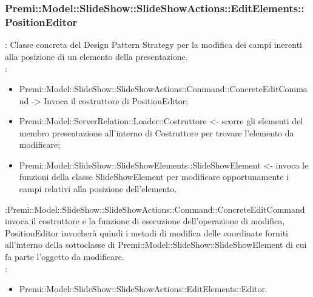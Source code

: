 {	\subsubsection{Premi::Model::SlideShow::SlideShowActions::EditElements::PositionEditor}{
				\textbf{\tipo}: Classe concreta del Design Pattern Strategy per la modifica dei campi inerenti alla posizione di un elemento della presentazione.\\	
				\textbf{\relaz}: 
				\begin{itemize}
					\item Premi::Model::SlideShow::SlideShowActions::Command::ConcreteEditCommand -> Invoca il costruttore di PositionEditor;
                    \item Premi::Model::ServerRelation::Loader::Costruttore <- scorre gli elementi del membro presentazione all'interno di Costruttore per trovare l'elemento da modificare; 
                    \item Premi::Model::SlideShow::SlideShowElements::SlideShowElement <- invoca le funzioni della classe SlideShowElement per modificare opportunamente i campi relativi alla posizione dell’elemento.
				\end{itemize}	\textbf{\interfacce}:Premi::Model::SlideShow::SlideShowActions::Command::ConcreteEditCommand invoca il costruttore e la funzione di esecuzione dell’operazione di modifica, PositionEditor invocherà quindi i metodi di modifica delle coordinate forniti all’interno della sottoclasse di Premi::Model::SlideShow::SlideShowElement di cui fa parte l’oggetto da modificare.\\
                \textbf{\base}: 
                    \begin{itemize}
                    \item Premi::Model::SlideShow::SlideShowActions::EditElements::Editor.
                    \end{itemize}
                    }
}
